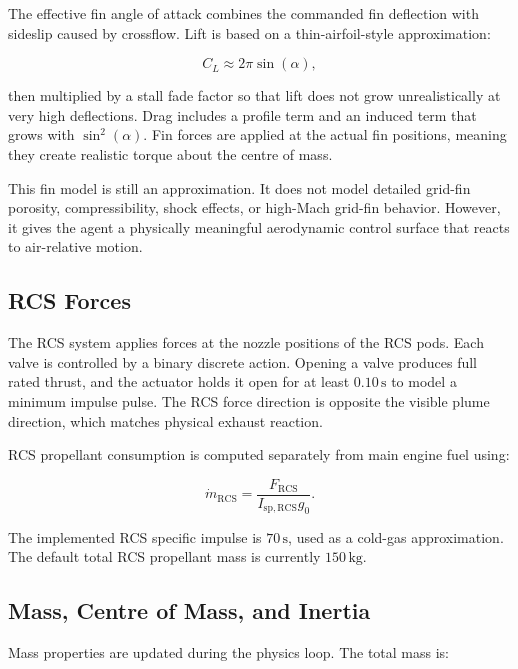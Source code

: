 \documentclass[12pt,a4paper]{article}
\begin{document}
The effective fin angle of attack combines the commanded fin deflection with sideslip caused by crossflow. Lift is based on a thin-airfoil-style approximation:

\begin{equation}
C_L \approx 2\pi \sin(\alpha),
\end{equation}

then multiplied by a stall fade factor so that lift does not grow unrealistically at very high deflections. Drag includes a profile term and an induced term that grows with \(\sin^2(\alpha)\). Fin forces are applied at the actual fin positions, meaning they create realistic torque about the centre of mass.

This fin model is still an approximation. It does not model detailed grid-fin porosity, compressibility, shock effects, or high-Mach grid-fin behavior. However, it gives the agent a physically meaningful aerodynamic control surface that reacts to air-relative motion.

\subsection{RCS Forces}

The RCS system applies forces at the nozzle positions of the RCS pods. Each valve is controlled by a binary discrete action. Opening a valve produces full rated thrust, and the actuator holds it open for at least \(0.10\,\mathrm{s}\) to model a minimum impulse pulse. The RCS force direction is opposite the visible plume direction, which matches physical exhaust reaction.

RCS propellant consumption is computed separately from main engine fuel using:

\begin{equation}
\dot{m}_{\mathrm{RCS}} =
\frac{F_{\mathrm{RCS}}}{I_{\mathrm{sp,RCS}} g_0}.
\end{equation}

The implemented RCS specific impulse is \(70\,\mathrm{s}\), used as a cold-gas approximation. The default total RCS propellant mass is currently \(150\,\mathrm{kg}\).

\subsection{Mass, Centre of Mass, and Inertia}

Mass properties are updated during the physics loop. The total mass is:
\end{document}
